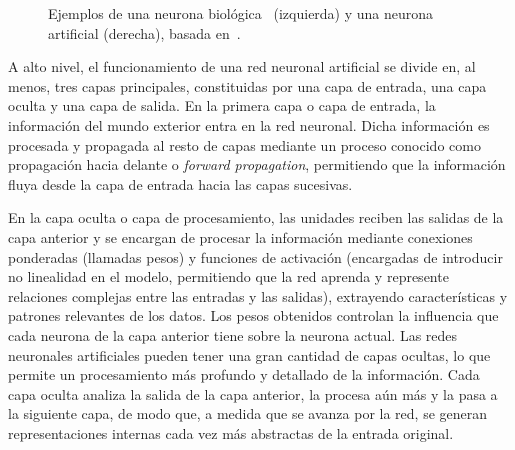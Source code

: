 \begin{figure}[h]
    \centering
    \hfill
    \caption[Ejemplos de neurona biológica~\cite{Neves2018} y neurona artificial (basada en~\cite{Li2024}).]{Ejemplos de una neurona biológica~\cite{Neves2018} (izquierda) y una neurona artificial (derecha), basada en~\cite{Li2024}.}\label{fig:neuronasbioyartificial}
\end{figure}

A alto nivel, el funcionamiento de una red neuronal artificial se divide en, al menos, tres capas principales, constituidas por una capa de entrada, una capa oculta y una capa de salida. En la primera capa o capa de entrada, la información del mundo exterior entra en la red neuronal. Dicha información es procesada y propagada al resto de capas mediante un proceso conocido como propagación hacia delante o \emph{forward propagation}, permitiendo que la información fluya desde la capa de entrada hacia las capas sucesivas.\newline

En la capa oculta o capa de procesamiento, las unidades reciben las salidas de la capa anterior y se encargan de procesar la información mediante conexiones ponderadas (llamadas pesos) y funciones de activación (encargadas de introducir no linealidad en el modelo, permitiendo que la red aprenda y represente relaciones complejas entre las entradas y las salidas), extrayendo características y patrones relevantes de los datos. Los pesos obtenidos controlan la influencia que cada neurona de la capa anterior tiene sobre la neurona actual. Las redes neuronales artificiales pueden tener una gran cantidad de capas ocultas, lo que permite un procesamiento más profundo y detallado de la información. Cada capa oculta analiza la salida de la capa anterior, la procesa aún más y la pasa a la siguiente capa, de modo que, a medida que se avanza por la red, se generan representaciones internas cada vez más abstractas de la entrada original.\newline


